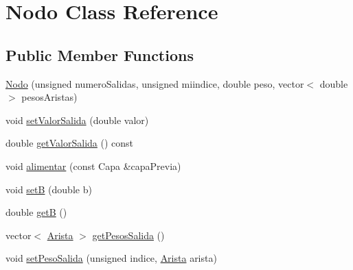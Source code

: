 \hypertarget{classNodo}{\section{Nodo Class Reference}
\label{classNodo}
}
\subsection*{Public Member Functions}
\begin{DoxyCompactItemize}
\item 
\hyperlink{classNodo_afb708898b880a4de342315a874c41da8}{Nodo} (unsigned numero\-Salidas, unsigned miindice, double peso, vector$<$ double $>$ pesos\-Aristas)
\item 
void \hyperlink{classNodo_a68e3ca116114771acd83bc92276f7978}{set\-Valor\-Salida} (double valor)
\item 
double \hyperlink{classNodo_aae7003873d5cdf18f87b530e9eb21c37}{get\-Valor\-Salida} () const 
\item 
void \hyperlink{classNodo_a9ee158f56659ac0ec5e079ba6e4423d4}{alimentar} (const Capa \&capa\-Previa)
\item 
void \hyperlink{classNodo_a894f810838840e287266559b03d09766}{set\-B} (double b)
\item 
double \hyperlink{classNodo_afd4affc1fd3789b10e1c52f6c81ff506}{get\-B} ()
\item 
vector$<$ \hyperlink{structArista}{Arista} $>$ \hyperlink{classNodo_abdf076e5ad4b680f75d2a5fb73647adb}{get\-Pesos\-Salida} ()
\item 
void \hyperlink{classNodo_a504539adc007d73aa98ec3429fde76db}{set\-Peso\-Salida} (unsigned indice, \hyperlink{structArista}{Arista} arista)
\end{DoxyCompactItemize}



